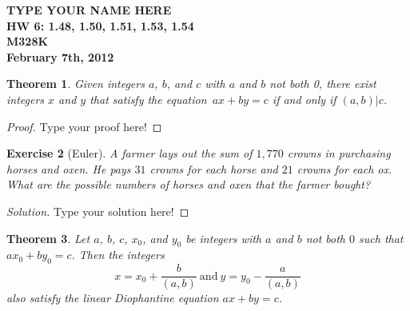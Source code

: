 \documentclass[12pt,leqno]{article}
\numberwithin{equation}{section}
\newtheorem{thm}{Theorem}[section]
\newtheorem{exer}[thm]{Exercise}
\theoremstyle{definition}
\begin{document}
\thispagestyle{plain}
\begin{flushright}
\large{\textbf{TYPE YOUR NAME HERE \\
HW 6: 1.48, 1.50, 1.51, 1.53, 1.54\\
M328K \\
February 7th, 2012 \\}}
\end{flushright}

\markboth{}{} \setcounter{section}{0} \baselineskip=18pt

\setcounter{tocdepth}{4}



\setcounter{section}{1}

\setcounter{thm}{47}

\begin{thm}
Given integers $a$, $b$, and $c$ with $a$ and $b$ not both 0, there
exist integers $x$ and $y$ that satisfy the equation~$ax + by = c$
if and only if $(a, b)|c$.
\end{thm}

\begin{proof}[Proof]
Type your proof here!
\end{proof}

\setcounter{thm}{49}

\begin{exer}[Euler]
A farmer lays out the sum of $1,770$ crowns in purchasing horses and
oxen.  He pays $31$ crowns for each horse and $21$ crowns for each
ox.  What are the possible numbers of horses and oxen that the
farmer bought?
\end{exer}

\begin{proof}[Solution]
Type your solution here!
\end{proof}

\begin{thm}
Let $a$, $b$, $c$, $x_0$, and $y_0$ be integers with $a$ and $b$ not
both $0$ such that $ax_0 + by_0 = c$.  Then the integers
\[x = x_0 + \frac{b}{(a,b)}\ {\textstyle\textrm{and}}\
y = y_0 - \frac{a}{(a,b)}\] also satisfy the linear Diophantine
equation $ax + by = c$.
\end{thm}
\end{document}
